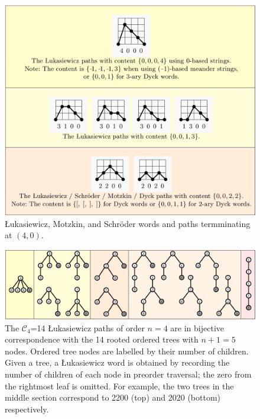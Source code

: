 \begin{figure}[]
	\centering
	\includegraphics[width = .95 \textwidth]{paths.png}
	\caption{Łukasiewicz, Motzkin, and Schröder words and paths termminating at $(4,0)$.}
	\label{fig:paths}
\end{figure}




\begin{figure}[]
	\centering
	\includegraphics[width = .95 \textwidth]{trees.png}
	\caption[The $\mathcal{C}_4$=14 Łukasiewicz paths of order $n=4$ are in bijective correspondence with the 14 rooted ordered trees with $n+1=5$ nodes.]{The $\mathcal{C}_4$=14 Łukasiewicz paths of order $n=4$ are in bijective correspondence with the 14 rooted ordered trees with $n+1=5$ nodes.  Ordered tree nodes are labelled by their number of children.  Given a tree, a Łukasiewicz word is obtained by recording the number of children of each node in preorder traversal; the zero from the rightmost leaf is omitted.  For example, the two trees in the middle section correspond to 2200 (top) and 2020 (bottom) respectively.}
	\label{fig:lukatrees}
\end{figure}


